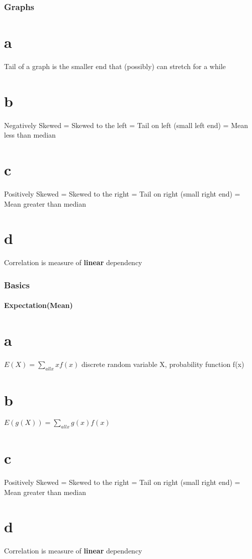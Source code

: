 \documentclass[12pt]{article}
\begin{document}
\section{Graphs}

\begin{itemize}
\part{a} Tail of a graph is the smaller end that (possibly) can stretch for a while
\part{b} Negatively Skewed = Skewed to the left = Tail on left (small left end) = Mean less than median
\part{c} Positively Skewed = Skewed to the right = Tail on right (small right end) = Mean greater than median
\part{d} Correlation is measure of \textbf{linear} dependency
\end{itemize}
\section{Basics}
\subsection{Expectation(Mean)}
\begin{itemize}
\part{a} $E(X)=\sum_{all x} xf(x)$ discrete random variable X, probability function f(x)
\part{b} $E(g(X))=\sum_{all x} g(x)f(x)$
\part{c} Positively Skewed = Skewed to the right = Tail on right (small right end) = Mean greater than median
\part{d} Correlation is measure of \textbf{linear} dependency
\end{itemize}
\end{document}
